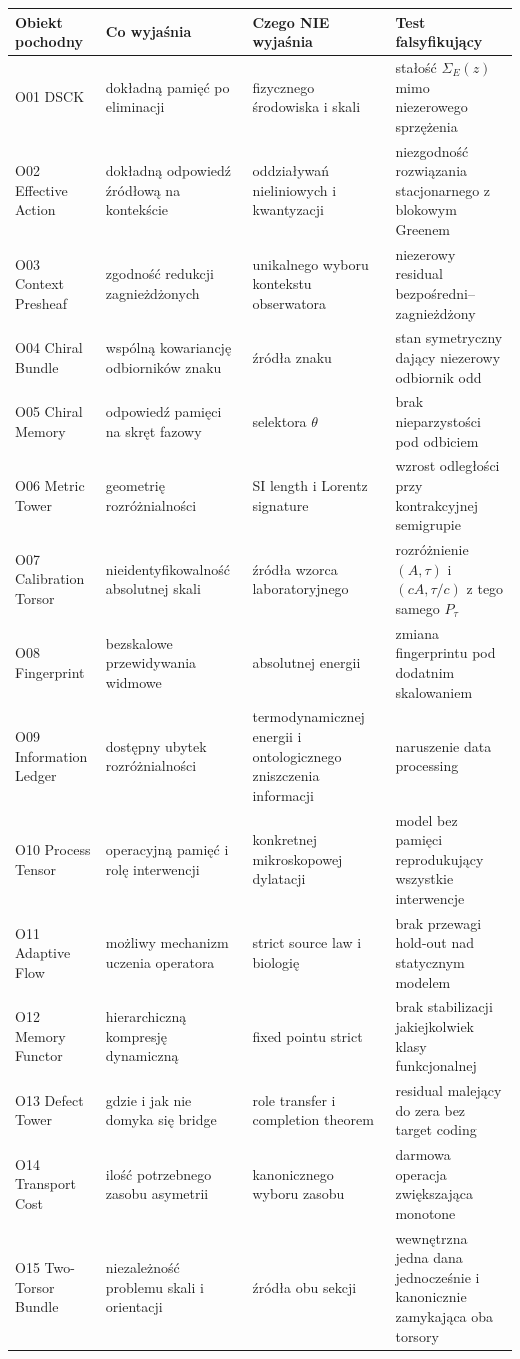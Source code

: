 \documentclass[11pt,a4paper,openany]{report}
\begin{document}
\begin{center}
\begingroup\small
\setlength{\tabcolsep}{2.5pt}
\renewcommand{\arraystretch}{1.16}
\begin{longtable}{@{}p{}p{}p{}p{}@{}}
\toprule
\textbf{Obiekt pochodny} & \textbf{Co wyjaśnia} & \textbf{Czego NIE wyjaśnia} & \textbf{Test falsyfikujący} \\
\midrule
\endhead
O01 DSCK & dokładną pamięć po eliminacji & fizycznego środowiska i skali & stałość \(\Sigma_E(z)\) mimo niezerowego sprzę\.zenia \\
O02 Effective Action & dokładną odpowiedź źródłową na kontekście & oddziaływań nieliniowych i kwantyzacji & niezgodność rozwiązania stacjonarnego z blokowym Greenem \\
O03 Context Presheaf & zgodność redukcji zagnie\.zd\.zonych & unikalnego wyboru kontekstu obserwatora & niezerowy residual bezpośredni--zagnie\.zd\.zony \\
O04 Chiral Bundle & wspólną kowariancję odbiorników znaku & źródła znaku & stan symetryczny dający niezerowy odbiornik odd \\
O05 Chiral Memory & odpowiedź pamięci na skręt fazowy & selektora \(\theta\) & brak nieparzystości pod odbiciem \\
O06 Metric Tower & geometrię rozró\.znialności & SI length i Lorentz signature & wzrost odległości przy kontrakcyjnej semigrupie \\
O07 Calibration Torsor & nieidentyfikowalność absolutnej skali & źródła wzorca laboratoryjnego & rozró\.znienie \((A,\tau)\) i \((cA,\tau/c)\) z tego samego \(P_\tau\) \\
O08 Fingerprint & bezskalowe przewidywania widmowe & absolutnej energii & zmiana fingerprintu pod dodatnim skalowaniem \\
O09 Information Ledger & dostępny ubytek rozró\.znialności & termodynamicznej energii i ontologicznego zniszczenia informacji & naruszenie data processing \\
O10 Process Tensor & operacyjną pamięć i rolę interwencji & konkretnej mikroskopowej dylatacji & model bez pamięci reprodukujący wszystkie interwencje \\
O11 Adaptive Flow & mo\.zliwy mechanizm uczenia operatora & strict source law i biologię & brak przewagi hold-out nad statycznym modelem \\
O12 Memory Functor & hierarchiczną kompresję dynamiczną & fixed pointu strict & brak stabilizacji jakiejkolwiek klasy funkcjonalnej \\
O13 Defect Tower & gdzie i jak nie domyka się bridge & role transfer i completion theorem & residual malejący do zera bez target coding \\
O14 Transport Cost & ilość potrzebnego zasobu asymetrii & kanonicznego wyboru zasobu & darmowa operacja zwiększająca monotone \\
O15 Two-Torsor Bundle & niezale\.zność problemu skali i orientacji & źródła obu sekcji & wewnętrzna jedna dana jednocześnie i kanonicznie zamykająca oba torsory \\
\bottomrule
\end{longtable}
\endgroup
\end{center}
\end{document}
